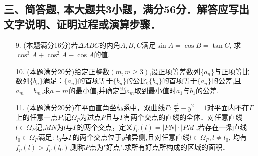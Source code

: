 \documentclass[10pt,a4paper]{ctexart}
\begin{document}
	\subsection*{三、简答题, 本大题共3小题，满分56分．解答应写出文字说明、证明过程或演算步骤．}
	\begin{spacing}{1.8}
		\begin{itemize}
			\item[9.](本题满分16分)若$\Delta ABC$的内角$A,B,C$满足$\sin A=\cos B=\tan C$, 求$\cos ^3 A+\cos ^2 A-\cos A$的值.
			\item[10.](本题满分20分)给定正整数$(m,m\geq 3)$,设正项等差数列$\{a_n\}$与正项等比数列$\{b_n\}$满足：$\{a_n\}$的首项等于$\{b_n\}$的公比,$\{b_n\}$的首项等于$\{a_n\}$的公差,且$a_m=b_m$,求$a+m$的最小值,并确定当$a_m$取到最小值时$a_1$与$b_1$的公差.
			\item[11.](本题满分20分)在平面直角坐标系中，双曲线$\Gamma$: $\frac{x^2}{3}-y^2=1$对平面内不在$\Gamma$上的任意一点$P$,记$\Omega_P$为过点$P$且与$\Gamma$有两个交点的直线的全体．对任意直线$l\in \Omega_P$记,$MN$为$l$与$\Gamma$的两个交点，定义$f_p(l)=|PN|\cdot |PM|$,若存在一条直线$l_0\in \Omega_P$满足: $l_0$与$\Gamma $的两个交点位于$y$轴异侧,且对任意直线$l\in \Omega_P,l\neq l_0$, 均有$f_p(l)>f_p(l_0)$,则称$P$点为"好点",求所有好点所构成的区域的面积．
		\end{itemize}
	\end{spacing}
\end{document}
